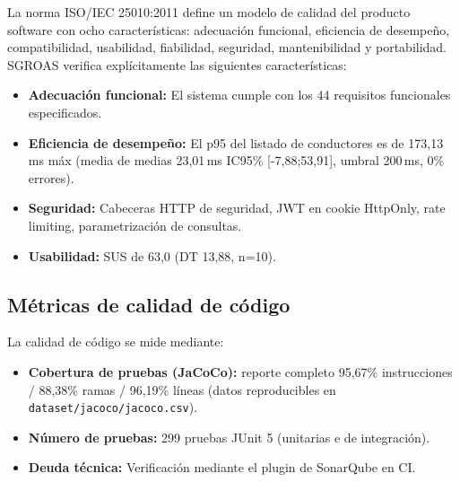 La norma ISO/IEC 25010:2011 \cite{iso25010} define un modelo de calidad del producto software con ocho características: adecuación funcional, eficiencia de desempeño, compatibilidad, usabilidad, fiabilidad, seguridad, mantenibilidad y portabilidad. SGROAS verifica explícitamente las siguientes características:
\begin{itemize}
  \item \textbf{Adecuación funcional:} El sistema cumple con los 44 requisitos funcionales especificados.
  \item \textbf{Eficiencia de desempeño:} El p95 del listado de conductores es de 173,13\,ms máx (media de medias 23,01\,ms IC95\% [-7,88;53,91], umbral 200\,ms, 0\% errores).
  \item \textbf{Seguridad:} Cabeceras HTTP de seguridad, JWT en cookie HttpOnly, rate limiting, parametrización de consultas.
  \item \textbf{Usabilidad:} SUS de 63,0 (DT 13,88, n=10).
\end{itemize}

\subsection{Métricas de calidad de código}
\label{sec:code-quality}

La calidad de código se mide mediante:
\begin{itemize}
  \item \textbf{Cobertura de pruebas (JaCoCo):} reporte completo 95,67\% instrucciones / 88,38\% ramas / 96,19\% líneas (datos reproducibles en \texttt{dataset/jacoco/jacoco.csv}).
  \item \textbf{Número de pruebas:} 299 pruebas JUnit 5 (unitarias e de integración).
  \item \textbf{Deuda técnica:} Verificación mediante el plugin de SonarQube en CI.
\end{itemize}
